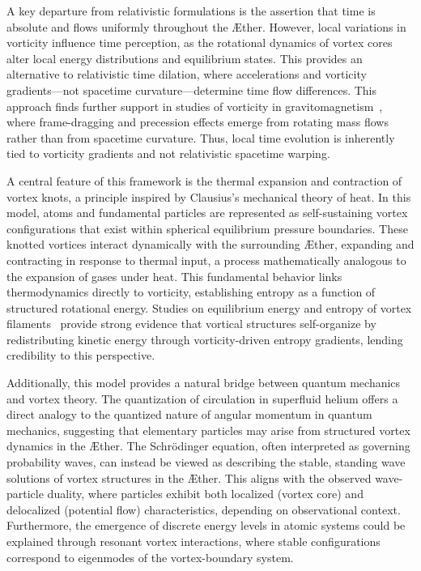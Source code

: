 A key departure from relativistic formulations is the assertion that time is absolute and flows uniformly throughout the \AE ther.
However, local variations in vorticity influence time perception, as the rotational dynamics of vortex cores alter local energy distributions and equilibrium states.
This provides an alternative to relativistic time dilation, where accelerations and vorticity gradients—not spacetime curvature—determine time flow differences.
This approach finds further support in studies of vorticity in gravitomagnetism~\cite{cahill2005}, where frame-dragging and precession effects emerge from rotating mass flows rather than from spacetime curvature.
Thus, local time evolution is inherently tied to vorticity gradients and not relativistic spacetime warping.

A central feature of this framework is the thermal expansion and contraction of vortex knots, a principle inspired by Clausius’s mechanical theory of heat.
In this model, atoms and fundamental particles are represented as self-sustaining vortex configurations that exist within spherical equilibrium pressure boundaries.
These knotted vortices interact dynamically with the surrounding \AE ther, expanding and contracting in response to thermal input, a process mathematically analogous to the expansion of gases under heat.
This fundamental behavior links thermodynamics directly to vorticity, establishing entropy as a function of structured rotational energy.
Studies on equilibrium energy and entropy of vortex filaments~\cite{belik2023} provide strong evidence that vortical structures self-organize by redistributing kinetic energy through vorticity-driven entropy gradients, lending credibility to this perspective.

Additionally, this model provides a natural bridge between quantum mechanics and vortex theory.
The quantization of circulation in superfluid helium offers a direct analogy to the quantized nature of angular momentum in quantum mechanics, suggesting that elementary particles may arise from structured vortex dynamics in the \AE ther.
The Schrödinger equation, often interpreted as governing probability waves, can instead be viewed as describing the stable, standing wave solutions of vortex structures in the \AE ther.
This aligns with the observed wave-particle duality, where particles exhibit both localized (vortex core) and delocalized (potential flow) characteristics, depending on observational context.
Furthermore, the emergence of discrete energy levels in atomic systems could be explained through resonant vortex interactions, where stable configurations correspond to eigenmodes of the vortex-boundary system.

